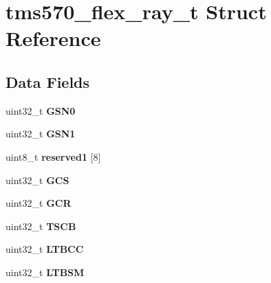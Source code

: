 \hypertarget{structtms570__flex__ray__t}{}\section{tms570\+\_\+flex\+\_\+ray\+\_\+t Struct Reference}
\label{structtms570__flex__ray__t}
\subsection*{Data Fields}
\begin{DoxyCompactItemize}
\item 
\mbox{\label{structtms570__flex__ray__t_abaacb792774ca7e10b75a76a08f61865}} 
uint32\+\_\+t {\bfseries G\+S\+N0}
\item 
\mbox{\label{structtms570__flex__ray__t_a49a822c7cf1c0ca2502c9ff4e768dd5c}} 
uint32\+\_\+t {\bfseries G\+S\+N1}
\item 
\mbox{\label{structtms570__flex__ray__t_acb2a1c85c14e73fe87d89d57668580b0}} 
uint8\+\_\+t {\bfseries reserved1} \mbox{[}8\mbox{]}
\item 
\mbox{\label{structtms570__flex__ray__t_aff824cdaaabf5b5f7b53af79de56c070}} 
uint32\+\_\+t {\bfseries G\+CS}
\item 
\mbox{\label{structtms570__flex__ray__t_a99a49587dc385b3dab68ecd397c60dd3}} 
uint32\+\_\+t {\bfseries G\+CR}
\item 
\mbox{\label{structtms570__flex__ray__t_a547388059b4b88b79597c01a8a3d617c}} 
uint32\+\_\+t {\bfseries T\+S\+CB}
\item 
\mbox{\label{structtms570__flex__ray__t_a17b33598b9e3b353eb492316e494442e}} 
uint32\+\_\+t {\bfseries L\+T\+B\+CC}
\item 
\mbox{\label{structtms570__flex__ray__t_ac20a506b8791a2cb06269fb66e106c86}} 
uint32\+\_\+t {\bfseries L\+T\+B\+SM}
\item 
\mbox{\label{structtms570__flex__ray__t_abb1a7216f30f8c8df318fb8cd24c943f}} 

\end{DoxyCompactItemize}
